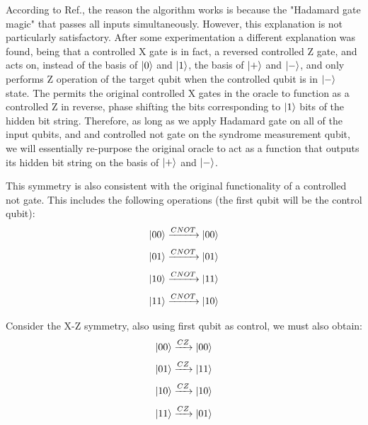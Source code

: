 \documentclass{article}
\begin{document}
According to Ref.\cite{paulsearleBernsteinVaziraniAlgorithmProgramming2019}, the reason the algorithm works is because the "Hadamard gate magic" that passes all inputs simultaneously. However, this explanation is not particularly satisfactory. After some experimentation a different explanation was found, being that a controlled X gate is in fact, a reversed controlled Z gate, and acts on, instead of the basis of $\ket{0}$ and $\ket{1}$, the basis of $\ket{+}$ and $\ket{-}$, and only performs Z operation of the target qubit when the controlled qubit is in $\ket{-}$ state. The permits the original controlled X gates in the oracle to function as a controlled Z in reverse, phase shifting the bits corresponding to $\ket{1}$ bits of the hidden bit string. Therefore, as long as we apply Hadamard gate on all of the input qubits, and and controlled not gate on the syndrome measurement qubit, we will essentially re-purpose the original oracle to act as a function that outputs its hidden bit string on the basis of $\ket{+}$ and $\ket{-}$. 

This symmetry is also consistent with the original functionality of a controlled not gate. This includes the following operations (the first qubit will be the control qubit):\newline
\begin{equation}
    \ket{00} \xrightarrow{CNOT} \ket{00}
\end{equation}
\begin{equation}
    \ket{01} \xrightarrow{CNOT} \ket{01}
\end{equation}
\begin{equation}
    \ket{10} \xrightarrow{CNOT} \ket{11}
\end{equation}
\begin{equation}
    \ket{11} \xrightarrow{CNOT} \ket{10}
\end{equation}

Consider the X-Z symmetry, also using first qubit as control, we must also obtain:
\begin{equation}
    \ket{00} \xrightarrow{CZ} \ket{00}
\end{equation}
\begin{equation}
    \ket{01} \xrightarrow{CZ} \ket{11}
\end{equation}
\begin{equation}
    \ket{10} \xrightarrow{CZ} \ket{10}
\end{equation}
\begin{equation}
    \ket{11} \xrightarrow{CZ} \ket{01}
\end{equation}
\end{document}
